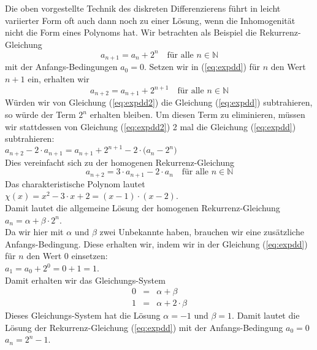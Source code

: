 \noindent
Die oben vorgestellte Technik des diskreten Differenzierens f\"{u}hrt in leicht variierter
Form oft auch dann noch zu einer L\"{o}sung, wenn die Inhomogenit\"{a}t nicht die Form eines
Polynoms hat.  Wir betrachten als Beispiel die Rekurrenz-Gleichung 
\begin{equation}
  \label{eq:expdd}
  a_{n+1} = a_n + 2^n \quad \mbox{f\"{u}r alle $n \in \mathbb{N}$}
\end{equation}
mit der Anfangs-Bedingungen $a_0 = 0$.   Setzen wir in (\ref{eq:expdd}) f\"{u}r $n$ den Wert $n+1$
ein, erhalten wir 
\begin{equation}
  \label{eq:expdd2}
  a_{n+2} = a_{n+1} + 2^{n+1} \quad \mbox{f\"{u}r alle $n \in \mathbb{N}$}
\end{equation}
W\"{u}rden wir von Gleichung (\ref{eq:expdd2}) die Gleichung (\ref{eq:expdd}) subtrahieren, so w\"{u}rde
der Term $2^n$ erhalten bleiben.  Um diesen Term zu eliminieren, m\"{u}ssen wir stattdessen
von Gleichung (\ref{eq:expdd2}) 2 mal die Gleichung (\ref{eq:expdd})  subtrahieren: \\[0.2cm]
\hspace*{1.3cm}  
$a_{n+2} - 2 \cdot a_{n+1} = a_{n+1} + 2^{n+1} - 2 \cdot \bigl(a_n - 2^n\bigr)$ 
                 \\[0.2cm]
Dies vereinfacht sich zu der homogenen Rekurrenz-Gleichung 
\begin{equation}
  \label{eq:expdd3}
  a_{n+2} = 3 \cdot a_{n+1} - 2 \cdot a_n \quad \mbox{f\"{u}r alle $n \in \mathbb{N}$}  
\end{equation}
Das charakteristische Polynom lautet \\[0.2cm]
\hspace*{1.3cm} 
$\chi(x) = x^2 - 3 \cdot x + 2 = (x-1) \cdot (x-2)$.  \\[0.2cm]
Damit lautet die allgemeine L\"{o}sung der homogenen Rekurrenz-Gleichung \\[0.2cm]
\hspace*{1.3cm} 
$a_n = \alpha + \beta \cdot 2^n$.  \\[0.2cm]
Da wir hier mit $\alpha$ und $\beta$ zwei Unbekannte haben, brauchen wir eine zus\"{a}tzliche
Anfangs-Bedingung.  Diese erhalten wir, indem wir in der Gleichung (\ref{eq:expdd}) f\"{u}r $n$
den Wert $0$ einsetzen: \\[0.2cm]
\hspace*{1.3cm} $a_1 = a_0 + 2^0 = 0 + 1 = 1$. \\[0.2cm]
Damit erhalten wir das Gleichungs-System 
\[ 
\begin{array}{lcl}
0 &=& \alpha  + \beta  \\
1 &=& \alpha  + 2 \cdot \beta
\end{array} 
\]
Dieses Gleichungs-System hat die L\"{o}sung $\alpha = -1$ und $\beta = 1$.
Damit lautet die L\"{o}sung der Rekurrenz-Gleichung (\ref{eq:expdd}) mit der Anfangs-Bedingung
$a_0 = 0$ \\[0.2cm]
\hspace*{1.3cm} $a_n = 2^n - 1$.


